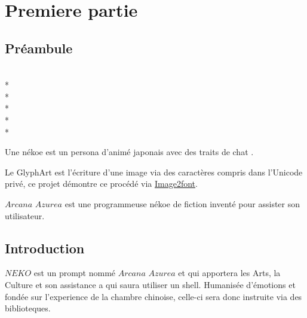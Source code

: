 \documentclass{book}
\newcommand{\name}{\textit{Arcana Azurea}}
\newcommand{\program}{\textit{NEKO}}
\begin{document}
\tableofcontents

\chapter{Premiere partie}

\section{Préambule}

\begin{minipage}{1in}
  \fontsize{50pt}{12pt}\selectfont
  \\*
  \\*
  \\*
  \\*
  \\*
\end{minipage}

Une nékoe est un persona d'animé japonais avec des traits de chat
 \textendash.

Le GlyphArt est l'écriture d'une image via des caractères compris dans l'Unicode privé, ce projet démontre ce procédé via
\href{https://limaconoob.github.io/Image2font}{Image2font}.

$\name$ est une programmeuse nékoe de fiction inventé pour assister son utilisateur.

\section{Introduction}
\thispagestyle{empty}
$\program$ est un prompt nommé $\name$ et qui apportera les Arts, la Culture et son assistance a qui saura utiliser un shell.
Humanisée d’émotions et fondée sur l'experience de la chambre chinoise, celle-ci sera donc instruite via des biblioteques.
\end{document}
